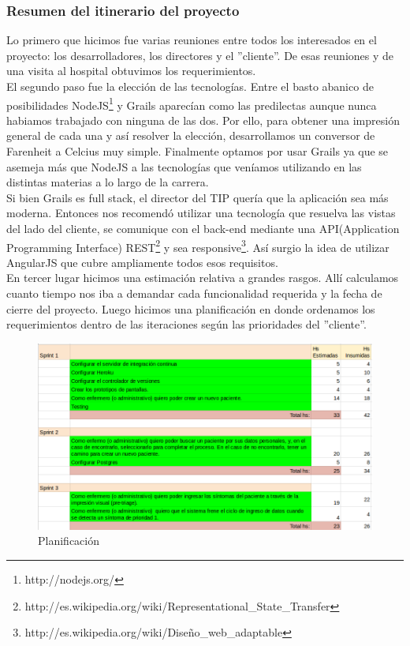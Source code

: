\subsubsection{Resumen del itinerario del proyecto}
Lo primero que hicimos fue varias reuniones entre todos los interesados en el proyecto: los desarrolladores, los directores y el ''cliente''. De esas reuniones y de una visita al hospital obtuvimos los requerimientos.\\
El segundo paso fue la elección de las tecnologías. Entre el basto abanico de posibilidades NodeJS\footnote{http://nodejs.org/} y Grails aparecían como las predilectas aunque nunca habiamos trabajado con ninguna de las dos. Por ello, para obtener una impresión general de cada una y así resolver la elección, desarrollamos un conversor de Farenheit a Celcius muy simple. Finalmente optamos por usar Grails ya que se asemeja más que NodeJS a las tecnologías que veníamos utilizando en las distintas materias a lo largo de la carrera.\\
Si bien Grails es full stack, el director del TIP quería que la aplicación sea más moderna. Entonces nos recomendó utilizar una tecnología que resuelva las vistas del lado del cliente, se comunique con el back-end mediante una API(Application Programming Interface) REST\footnote{http://es.wikipedia.org/wiki/Representational\_State\_Transfer} 
y sea responsive\footnote{http://es.wikipedia.org/wiki/Diseño\_web\_adaptable}. Así surgio la idea de utilizar AngularJS que cubre ampliamente todos esos requisitos.\\
En tercer lugar hicimos una estimación relativa a grandes rasgos. Allí calculamos cuanto tiempo nos iba a demandar cada funcionalidad requerida y la fecha de cierre del proyecto. Luego hicimos una planificación en donde ordenamos los requerimientos dentro de las iteraciones según las prioridades del ''cliente''.\\

\begin{figure}[h]
  \centerline{\includegraphics[width=1.2\textwidth]{planificacion.png}}
  \caption{Planificación}
\end{figure}

